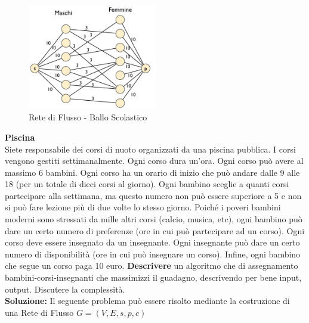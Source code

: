 \documentclass[../cheatSheetAlgoritmi.tex]{subfiles}
\begin{document}
\begin{figure}[h]
\caption{Rete di Flusso - Ballo Scolastico}
\centering
\includegraphics[width=0.5\textwidth]{../img/Locale_4.jpg}
\end{figure}
\textbf{Piscina}\\
Siete responsabile dei corsi di nuoto organizzati da una piscina pubblica. I corsi vengono gestiti settimanalmente. Ogni corso dura un’ora. Ogni corso può avere al massimo 6 bambini. Ogni corso ha un orario di inizio che può andare dalle 9 alle 18 (per un totale di dieci corsi al giorno). Ogni bambino sceglie a quanti corsi partecipare alla settimana, ma questo numero non può essere superiore a 5 e non si può fare lezione più di due volte lo stesso giorno. Poiché i poveri bambini moderni sono stressati da mille altri corsi (calcio, musica, etc), ogni bambino può dare un certo numero di preferenze (ore in cui può partecipare ad un corso). Ogni corso deve essere insegnato da un insegnante. Ogni insegnante può dare un certo numero di disponibilità (ore in cui può insegnare un corso). Infine, ogni bambino che segue un corso paga 10 euro. \textbf{Descrivere} un algoritmo che di assegnamento bambini-corsi-insegnanti che massimizzi il guadagno, descrivendo per bene input, output. Discutere la complessità.\\
\textbf{Soluzione:} Il seguente problema può essere risolto mediante la costruzione di una Rete di Flusso $G = (V, E, s, p, c)$
\end{document}
